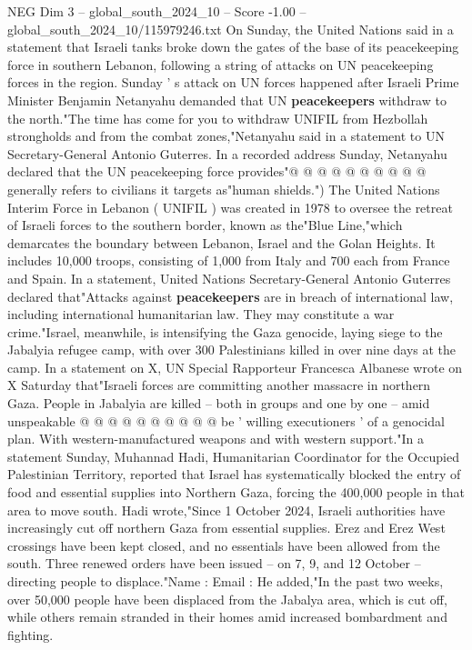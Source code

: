 \begin{textsample}{NEG Dim 3 – global\_south\_2024\_10 – Score -1.00 – global\_south\_2024\_10/115979246.txt}
On Sunday, the United Nations said in a statement that Israeli tanks broke down the gates of the base of its peacekeeping force in southern Lebanon, following a string of attacks on UN peacekeeping forces in the region.
Sunday ' s attack on UN forces happened after Israeli Prime Minister Benjamin Netanyahu demanded that UN \textbf{peacekeepers} withdraw to the north."The time has come for you to withdraw UNIFIL from Hezbollah strongholds and from the combat zones,"Netanyahu said in a statement to UN Secretary-General Antonio Guterres.
In a recorded address Sunday, Netanyahu declared that the UN peacekeeping force provides"@ @ @ @ @ @ @ @ @ @ generally refers to civilians it targets as"human shields.") The United Nations Interim Force in Lebanon ( UNIFIL ) was created in 1978 to oversee the retreat of Israeli forces to the southern border, known as the"Blue Line,"which demarcates the boundary between Lebanon, Israel and the Golan Heights.
It includes 10,000 troops, consisting of 1,000 from Italy and 700 each from France and Spain.
In a statement, United Nations Secretary-General Antonio Guterres declared that"Attacks against \textbf{peacekeepers} are in breach of international law, including international humanitarian law.
They may constitute a war crime."Israel, meanwhile, is intensifying the Gaza genocide, laying siege to the Jabalyia refugee camp, with over 300 Palestinians killed in over nine days at the camp.
In a statement on X, UN Special Rapporteur Francesca Albanese wrote on X Saturday that"Israeli forces are committing another massacre in northern Gaza.
People in Jabalyia are killed -- both in groups and one by one -- amid unspeakable @ @ @ @ @ @ @ @ @ @ be ' willing executioners ' of a genocidal plan.
With western-manufactured weapons and with western support."In a statement Sunday, Muhannad Hadi, Humanitarian Coordinator for the Occupied Palestinian Territory, reported that Israel has systematically blocked the entry of food and essential supplies into Northern Gaza, forcing the 400,000 people in that area to move south.
Hadi wrote,"Since 1 October 2024, Israeli authorities have increasingly cut off northern Gaza from essential supplies.
Erez and Erez West crossings have been kept closed, and no essentials have been allowed from the south.
Three renewed orders have been issued -- on 7, 9, and 12 October -- directing people to displace."Name : Email : He added,"In the past two weeks, over 50,000 people have been displaced from the Jabalya area, which is cut off, while others remain stranded in their homes amid increased bombardment and fighting.

\end{textsample}
